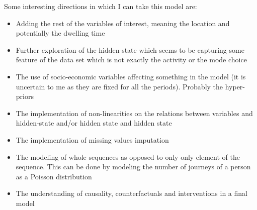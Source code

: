 \documentclass{article}
\begin{document}
Some interesting directions in which I can take this model are:
\begin{itemize}
    \item Adding the rest of the variables of interest, meaning the location and potentially the dwelling time
    \item Further exploration of the hidden-state which seems to be capturing some feature of the data set which is not exactly the activity or the mode choice
    \item The use of socio-economic variables affecting something in the model (it is uncertain to me as they are fixed for all the periods). Probably the hyper-priors
    \item The implementation of non-linearities on the relations between variables and hidden-state and/or hidden state and hidden state
    \item The implementation of missing values imputation
    \item The modeling of whole sequences as opposed to only only element of the sequence. This can be done by modeling the number of journeys of a person as a Poisson distribution
    \item The understanding of causality, counterfactuals and interventions in a final model
\end{itemize}
\end{document}
